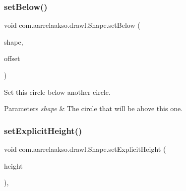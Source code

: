\mbox{\label{classcom_1_1aarrelaakso_1_1drawl_1_1_shape_aa0dd6332c22877c42b8c3863e5cc579e}} 
\subsubsection{\texorpdfstring{set\+Below()}{setBelow()}\hspace{0.1cm}{\footnotesize\ttfamily [2/2]}}
{\footnotesize\ttfamily void com.\+aarrelaakso.\+drawl.\+Shape.\+set\+Below (\begin{DoxyParamCaption}\item[{\hyperlink{classcom_1_1aarrelaakso_1_1drawl_1_1_shape}{Shape}}]{shape,  }\item[{\hyperlink{classcom_1_1aarrelaakso_1_1drawl_1_1_measure}{Measure}}]{offset }\end{DoxyParamCaption})\hspace{0.3cm}{\ttfamily [inherited]}}



Set this circle below another circle. 


\begin{DoxyParams}{Parameters}
{\em shape} & The circle that will be above this one. \\
\hline
\end{DoxyParams}
\mbox{\label{classcom_1_1aarrelaakso_1_1drawl_1_1_shape_ad3881ca048d83262948961f9f0ab23e3}} 
\subsubsection{\texorpdfstring{set\+Explicit\+Height()}{setExplicitHeight()}}
{\footnotesize\ttfamily void com.\+aarrelaakso.\+drawl.\+Shape.\+set\+Explicit\+Height (\begin{DoxyParamCaption}\item[{@Nullable \hyperlink{classcom_1_1aarrelaakso_1_1drawl_1_1_drawl_number}{Drawl\+Number}}]{height }\end{DoxyParamCaption})\hspace{0.3cm}{\ttfamily [protected]}, {\ttfamily [inherited]}}



